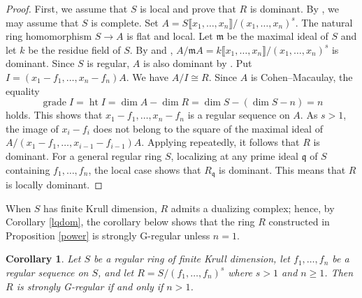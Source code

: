 \documentclass{amsart}
\newtheorem{cor}[thm]{Corollary}
\theoremstyle{definition}
\theoremstyle{remark}
\numberwithin{equation}{thm}
\def\ge{\geqslant}
\def\grade{\operatorname{grade}}
\def\height{\operatorname{ht}}
\def\m{\mathfrak{m}}
\def\q{\mathfrak{q}}
\begin{document}
\begin{proof}
First, we assume that $S$ is local and prove that $R$ is dominant.
By \cite[Corollary 5.8]{T23}, we may assume that $S$ is complete. Set $A=S\llbracket x_1,\ldots,x_n\rrbracket/(x_1,\ldots,x_n)^s$. The natural ring homomorphism $S\to A$ is flat and local. Let $\m$ be the maximal ideal of $S$ and let $k$ be the residue field of $S$. By \cite[Proposition 5.10(1)]{T23} and \cite[Proposition 6.3(1)(g)]{KT}, $A/\m A=k\llbracket x_1,\ldots,x_n\rrbracket/(x_1,\ldots,x_n)^s$ is dominant. Since $S$ is regular, $A$ is also dominant by \cite[Proposition 7.4]{T23}. 
Put $I=(x_1-f_1,\ldots,x_n-f_n)A$. We have $A/I\cong R$. Since $A$ is Cohen--Macaulay, the equality
$$\grade I=\height I=\dim A-\dim R=\dim S-(\dim S-n)=n$$ 
holds. This shows that $x_1-f_1,\ldots,x_n-f_n$ is a regular sequence on $A$. As $s>1$, the image of $x_i-f_i$ does not belong to the square of the maximal ideal of $A/(x_1-f_1,\ldots,x_{i-1}-f_{i-1})A$. Applying \cite[Theorem 5.6]{T23} repeatedly, it follows that $R$ is dominant. 
For a general regular ring $S$, localizing at any prime ideal $\q$ of $S$ containing $f_1,\ldots,f_n$, the local case shows that $R_\q$ is dominant. This means that $R$ is locally dominant.
\end{proof}

When $S$ has finite Krull dimension, $R$ admits a dualizing complex; hence, by Corollary \ref{lqdom}, the corollary below shows that the ring $R$ constructed in Proposition \ref{power} is strongly G-regular unless $n=1$.

\begin{cor}\label{5.2}
Let $S$ be a regular ring of finite Krull dimension, let $f_1,\ldots,f_n$ be a regular sequence on $S$, and let $R=S/(f_1,\ldots,f_n)^s$ where $s>1$ and $n\ge 1$.
Then $R$ is strongly G-regular if and only if $n>1$.
\end{cor}
\end{document}
